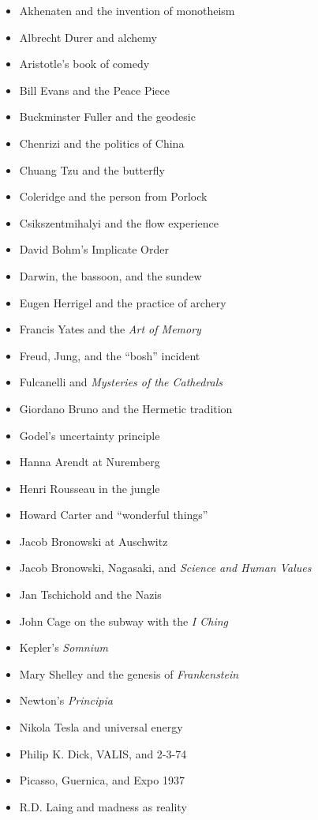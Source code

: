 \documentclass[letterpaper,10pt,headsepline]{scrreprt}
\begin{document}
\begin{itemize}
\item Akhenaten and the invention of monotheism
\item Albrecht Durer and alchemy
\item Aristotle's book of comedy
\item Bill Evans and the Peace Piece
\item Buckminster Fuller and the geodesic
\item Chenrizi and the politics of China
\item Chuang Tzu and the butterfly
\item Coleridge and the person from Porlock
\item Csikszentmihalyi and the flow experience
\item David Bohm's Implicate Order
\item Darwin, the bassoon, and the sundew
\item Eugen Herrigel and the practice of archery
\item Francis Yates and the \textit{Art of Memory}
\item Freud, Jung, and the ``bosh'' incident
\item Fulcanelli and \textit{Mysteries of the Cathedrals}
\item Giordano Bruno and the Hermetic tradition
\item Godel's uncertainty principle
\item Hanna Arendt at Nuremberg
\item Henri Rousseau in the jungle
\item Howard Carter and ``wonderful things''
\item Jacob Bronowski at Auschwitz
\item Jacob Bronowski, Nagasaki, and \textit{Science and Human Values}
\item Jan Tschichold and the Nazis
\item John Cage on the subway with the \textit{\textit{I Ching}}
\item Kepler's \textit{Somnium}
\item Mary Shelley and the genesis of \textit{Frankenstein}
\item Newton's \textit{Principia}
\item Nikola Tesla and universal energy
\item Philip K. Dick, VALIS, and 2-3-74
\item Picasso, Guernica, and Expo 1937
\item R.D. Laing and madness as reality

\end{itemize}
\end{document}
